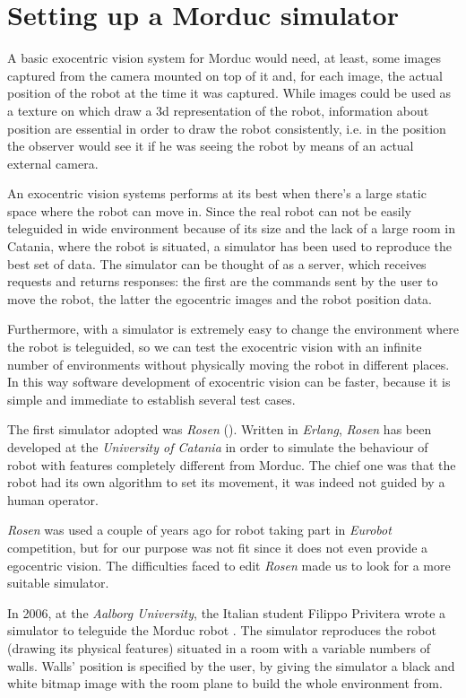 \section{Setting up a Morduc simulator}
\label{sec:simulator}
A basic exocentric vision system for Morduc would need, 
at least, some images captured from the camera mounted 
on top of it and, for each image, the actual position of 
the robot at the time it was captured.
%
While images could be used as a texture on which draw 
a 3d representation of the robot, information about 
position are essential in order to draw the robot 
consistently, i.e. in the position the observer would 
see it if he was seeing the robot by means of an actual 
external camera.
%

%
An exocentric vision systems performs at its best 
when there's a large static space where the robot can move in. Since 
the real robot can not be easily teleguided in wide 
environment because of its size and the lack of a large 
room in Catania, where the robot is situated, a simulator 
has been used to reproduce the best set of data. The 
simulator can be thought of as a server, which receives 
requests and returns responses: the first are the commands 
sent by the user to move the robot, the latter the 
egocentric images and the robot position data.
%

%
Furthermore, with a simulator is extremely easy to 
change the environment where the robot is teleguided, 
so we can test the exocentric vision with an infinite 
number of environments without physically moving the 
robot in different places. In this way software 
development of exocentric vision can be faster, because 
it is simple and immediate to establish several test cases.
%

%
The first simulator adopted was \textit{Rosen} (\cite{rosen}). Written in 
\textit{Erlang}\cite{erlang}, \textit{Rosen} has been developed at
the \textit{University of Catania} in order to simulate the behaviour of
robot with  features completely different from Morduc. The chief one 
was that the robot had its own algorithm to set its movement, 
it was indeed not guided by a human operator. 
%

%
\textit{Rosen} was used a couple of years ago for robot taking part 
in \textit{Eurobot} competition\cite{eurobot},
but for our purpose was not fit since it does not even 
provide a egocentric vision. The difficulties faced to edit 
\textit{Rosen} made us to look for a more suitable simulator.
%

%
In 2006, at the \textit{Aalborg University}, the Italian student Filippo 
Privitera wrote a simulator to teleguide the Morduc robot 
\cite{privitera}. The simulator reproduces the robot (drawing its 
physical features) situated in a room with a variable numbers 
of walls. Walls' position is specified by the user, by giving 
the simulator a black and white bitmap image with the room 
plane to build the whole environment from. 
%

